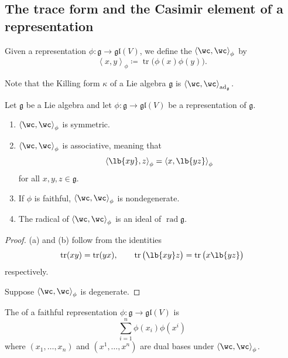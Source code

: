 \documentclass{article}
\newcommand\ip[1]{\left\langle{#1}\right\rangle}
\DeclarePairedDelimiter\lb\lbrack\rbrack
\DeclareMathOperator{\tr}{tr}
\DeclareMathOperator{\rad}{rad}
\newcommand*\ad{\operatorname{ad}}
\newcommand*\frkg{{\ensuremath{\mathfrak{g}}}}
\newcommand*\gl{\ensuremath{\mathfrak{gl}}}
\begin{document}
\subsection{The trace form and the Casimir element of a representation}

\begin{definition}
    Given a representation $\phi: \frkg \to \gl(V)$, we define the  $\ip{\wc,\wc}_\phi$ by
    \[
        \ip{x,y}_\phi
        \coloneq
        \tr\big(
            \phi(x)\phi(y)
        \big).
    \]
\end{definition}

Note that the Killing form $\kappa$ of a Lie algebra $\frkg$ is $\ip{\wc,\wc}_{\ad_\frkg}$.

\begin{proposition}
    Let $\frkg$ be a Lie algebra and let $\phi: \frkg \to \gl(V)$ be a representation of $\frkg$.
    \begin{enumerate}[label=(\alph*)]
        \item 
            $\ip{\wc,\wc}_\phi$ is symmetric.
        \item 
            $\ip{\wc,\wc}_\phi$ is associative, meaning that
            \[
                \ip{\lb{xy},z}_\phi
                =
                \ip{x,\lb{yz}}_\phi
            \]
            for all $x,y,z \in \frkg$.
        \item 
            If $\phi$ is faithful, $\ip{\wc,\wc}_\phi$ is nondegenerate.
        \item 
            The radical of $\ip{\wc,\wc}_\phi$ is an ideal of $\rad \frkg$.
    \end{enumerate}
\end{proposition}

\begin{proof}
    (a) and (b) follow from the identities
    \[
        \tr(xy) 
        = 
        \tr(yx),\qquad
        \tr\big(\lb{xy}z\big)
        =
        \tr\big(x\lb{yz}\big)
    \]
    respectively.

    Suppose $\ip{\wc,\wc}_\phi$ is degenerate.
    
\end{proof}

\begin{definition}
    The  of a faithful representation $\phi: \frkg \to \gl(V)$ is
    \[
        \sum_{i=1}^n
        \phi(x_i)\phi(x^i)
    \]
    where $(x_1,\ldots,x_n)$ and $(x^1, \ldots, x^n)$ are dual bases under $\ip{\wc,\wc}_\phi$.
\end{definition}
\end{document}
